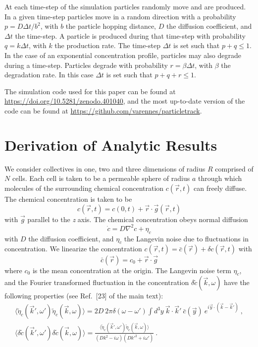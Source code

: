 At each time-step of the simulation particles randomly move and are produced. In a given time-step particles move in a random direction with a probability
$p = D\Delta t/b^2$,
with $b$ the particle hopping distance, $D$ the diffusion coefficient, and $\Delta t$ the time-step. A particle is produced during that time-step with probability
$q = k\Delta t$,
with $k$ the production rate. The time-step $\Delta t$ is set such that $p + q \leq 1$. In the case of an exponential concentration profile, particles may also degrade during a time-step. Particles degrade with probability
$r = \beta \Delta t$, with $\beta$ the degradation rate. In this case $\Delta t$ is set such that $p + q + r \leq 1$.

The simulation code used for this paper can be found at \url{https://doi.org/10.5281/zenodo.401040}, and the most up-to-date version of the code can be found at \url{https://github.com/varennes/particletrack}.


\section{Derivation of Analytic Results} \label{sct:ch3_SI}

We consider collectives in one, two and three dimensions of radius $R$ comprised of $N$ cells. Each cell is taken to be a permeable sphere of radius $a$ through which molecules of the surrounding chemical concentration $c(\vec{r},t)$ can freely diffuse. The chemical concentration is taken to be
\begin{equation}
    c(\vec{r},t) = c(0,t) + \vec{r}\cdot\vec{g}(\vec{r},t)
\end{equation}
with $\vec{g}$ parallel to the \textit{z} axis. The chemical concentration obeys normal diffusion
\begin{equation} \label{eq:diffeq}
    \dot{c} = D\nabla^2c+\eta_c
\end{equation}
with $D$ the diffusion coefficient, and $\eta_c$ the Langevin noise due to fluctuations in concentration. We linearize the concentration $c(\vec{r},t) = \bar{c}(\vec{r}) + \delta c(\vec{r},t)$ with
\begin{equation} \label{eq:meanc}
    \bar{c}(\vec{r}) = c_0 + \vec{r}\cdot\vec{g}
\end{equation}
where $c_0$ is the mean concentration at the origin. The Langevin noise term $\eta_c$, and the Fourier transformed fluctuation in the concentration $\delta\tilde{c}(\vec{k},\omega)$ have the following properties (see Ref.\ [23] of the main text):
\begin{gather}
    \langle\tilde{\eta}_c(\vec{k}',\omega')\tilde{\eta}_c(\vec{k},\omega) \rangle = 2D \ 2\pi\delta(\omega-\omega') \int d^3y \ \vec{k}\cdot\vec{k}' \ \bar{c}(\vec{y}) \ e^{i\vec{y}\cdot\left(\vec{k}-\vec{k}'\right)} \ ,
    \label{eq:c1} \\
    \langle\delta\tilde{c}(\vec{k}',\omega')\delta\tilde{c}(\vec{k},\omega) \rangle = \frac{\langle\tilde{\eta}_c(\vec{k}',\omega')\tilde{\eta}_c(\vec{k},\omega) \rangle}{(Dk^2-i\omega)(Dk'^2+i\omega')} \ .
    \label{eq:c2}
\end{gather}

